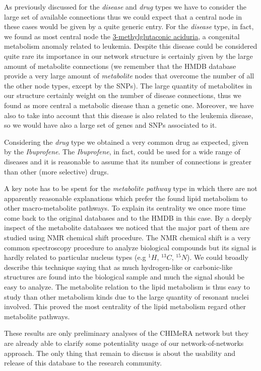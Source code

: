 \documentclass{standalone}
\begin{document}
As previously discussed for the \emph{disease} and \emph{drug} types we have to consider the large set of available connections thus we could expect that a central node in these cases would be given by a quite generic entry.
For the \emph{disease} type, in fact, we found as most central node the \href{https://en.wikipedia.org/wiki/3-Methylglutaconic_aciduria}{\textsf{3-methylglutaconic aciduria}}, a congenital metabolism anomaly related to leukemia.
Despite this disease could be considered quite rare its importance in our network structure is certainly given by the large amount of metabolite connections (we remember that the HMDB database provide a very large amount of \emph{metabolite} nodes that overcome the number of all the other node types, except by the SNPs).
The large quantity of metabolites in our structure certainly weight on the number of disease connections, thus we found as more central a metabolic disease than a genetic one.
Moreover, we have also to take into account that this disease is also related to the leukemia disease, so we would have also a large set of genes and SNPs associated to it.

Considering the \emph{drug} type we obtained a very common drug as expected, given by the \emph{Ibuprofene}.
The \emph{Ibuprofene}, in fact, could be used for a wide range of diseases and it is reasonable to assume that its number of connections is greater than other (more selective) drugs.

A key note has to be spent for the \emph{metabolite pathway} type in which there are not apparently reasonable explanations which prefer the found \textsf{lipid metabolism} to other macro-metabolite pathways.
To explain its centrality we once more time come back to the original databases and to the HMDB in this case.
By a deeply inspect of the metabolite databases we noticed that the major part of them are studied using NMR chemical shift procedure.
The NMR chemical shift is a very common spectroscopy procedure to analyze biological compounds but its signal is hardly related to particular nucleus types (e.g $^1H$, $^{13}C$, $^{15}N$).
We could broadly describe this technique saying that as much hydrogen-like or carbonic-like structures are found into the biological sample and much the signal should be easy to analyze.
The metabolite relation to the lipid metabolism is thus easy to study than other metabolism kinds due to the large quantity of resonant nuclei involved.
This proved the most centrality of the \textsf{lipid metabolism} regard other metabolite pathways.

These results are only preliminary analyses of the \textsf{CHIMeRA} network but they are already able to clarify some potentiality usage of our network-of-networks approach.
The only thing that remain to discuss is about the usability and release of this database to the research community.
\end{document}
